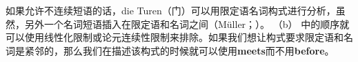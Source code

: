 \zl
如果允许不连续短语的话，die Turen（门）可以用限定语名词构式进行分析，虽然，另外一个名词短语插入在限定语和名词之间（Müller\citeyear[]{Mueller99a}；\citeyear{Mueller99f}）。 （b） 中的顺序就可以使用线性化限制或论元连续性限制来排除。如果我们想让构式要求限定语和名词是紧邻的，那么我们在描述该构式的时候就可以使用\textbf{meets}而不用\textbf{before}。

